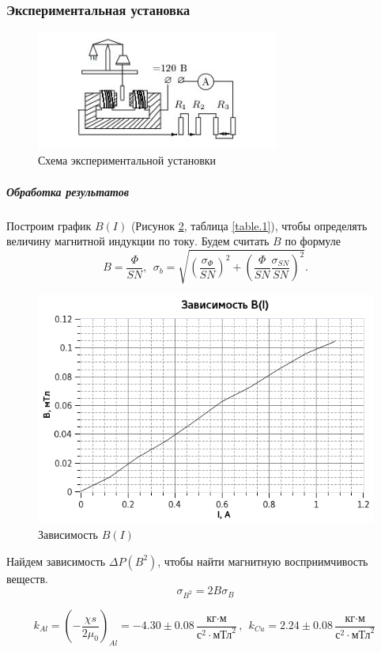 \documentclass{article}
\begin{document}
   \subsubsection*{Экспериментальная установка}
   \begin{figure}[h]
   \centering
   \includegraphics[width=8cm]{fig1.jpg} 
   \caption{Схема экспериментальной установки} 
   \label{fig.1} 
   \end{figure}
   \subparagraph*{Обработка результатов}
   Построим график $B(I)$ (Рисунок \ref{plot.1}, таблица \ref{table.1}), чтобы определять величину магнитной индукции по току. Будем считать $B$ по формуле
   \[ B = \frac{\Phi}{SN},~~ \sigma_b = \sqrt{\left(\frac{\sigma_\Phi}{SN}\right)^2 + \left( \frac{\Phi}{SN} \frac{\sigma_{SN}}{SN} \right)^2}. \]
   \begin{figure}[h]
   \centering
   \includegraphics[width=16cm]{plot1.png} 
   \caption{Зависимость $B(I)$} 
   \label{plot.1} 
   \end{figure}
   
   Найдем зависимость $\Delta P(B^2)$, чтобы найти магнитную восприимчивость веществ.
   \[ \sigma_{B^2} = 2B\sigma_B \]

   \[ k_{Al} = \left(-\frac{\chi s}{2\mu_0}\right)_{Al} =  -4.30 \pm 0.08 \frac{\text{кг}\cdot\text{м}}{\text{с}^2 \cdot \text{мТл}^2},~~  k_{Cu} = 2.24 \pm 0.08 \frac{\text{кг}\cdot\text{м}}{\text{с}^2 \cdot \text{мТл}^2} \]
\end{document}
